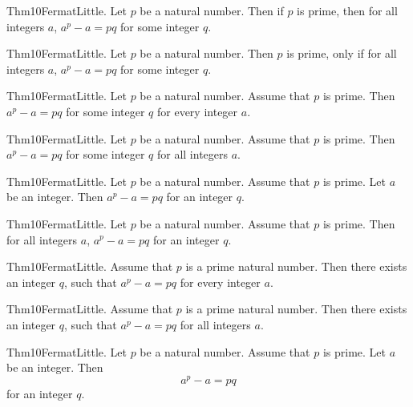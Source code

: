 \documentclass{article}
\begin{document}
Thm10FermatLittle. Let $p$ be a natural number. Then if $p$ is prime, then for all integers $a$, $a ^ {p}- a = p q$ for some integer $q$.

Thm10FermatLittle. Let $p$ be a natural number. Then $p$ is prime, only if for all integers $a$, $a ^ {p}- a = p q$ for some integer $q$.

Thm10FermatLittle. Let $p$ be a natural number. Assume that $p$ is prime. Then $a ^ {p}- a = p q$ for some integer $q$ for every integer $a$.

Thm10FermatLittle. Let $p$ be a natural number. Assume that $p$ is prime. Then $a ^ {p}- a = p q$ for some integer $q$ for all integers $a$.

Thm10FermatLittle. Let $p$ be a natural number. Assume that $p$ is prime. Let $a$ be an integer. Then $a ^ {p}- a = p q$ for an integer $q$.

Thm10FermatLittle. Let $p$ be a natural number. Assume that $p$ is prime. Then for all integers $a$, $a ^ {p}- a = p q$ for an integer $q$.

Thm10FermatLittle. Assume that $p$ is a prime natural number. Then there exists an integer $q$, such that $a ^ {p}- a = p q$ for every integer $a$.

Thm10FermatLittle. Assume that $p$ is a prime natural number. Then there exists an integer $q$, such that $a ^ {p}- a = p q$ for all integers $a$.

Thm10FermatLittle. Let $p$ be a natural number. Assume that $p$ is prime. Let $a$ be an integer. Then $$a ^ {p}- a = p q$$ for an integer $q$.
\end{document}
